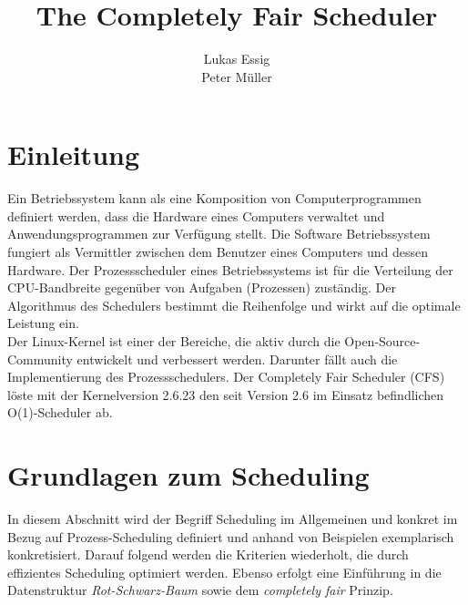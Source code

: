 \documentclass[ngerman]{seminarvorlage}
\begin{document}
\title{The Completely Fair Scheduler}
\author{
  \alignauthor Lukas Essig\\
  \alignauthor Peter Müller\\
}

\maketitle



\section{Einleitung}
Ein Betriebssystem kann als eine Komposition von Computerprogrammen definiert werden, dass die Hardware eines Computers verwaltet und Anwendungsprogrammen zur Verfügung stellt. Die Software Betriebssystem fungiert als Vermittler zwischen dem Benutzer eines Computers und dessen Hardware. Der Prozessscheduler eines Betriebssystems ist für die Verteilung der CPU-Bandbreite gegenüber von Aufgaben (Prozessen) zuständig. Der Algorithmus des Schedulers bestimmt die Reihenfolge und wirkt auf die optimale Leistung ein.\\
Der Linux-Kernel ist einer der Bereiche, die aktiv durch die Open-Source-Community entwickelt und verbessert werden. Darunter fällt auch die Implementierung des Prozessschedulers. Der Completely Fair Scheduler (CFS) löste mit der Kernelversion 2.6.23 den seit Version 2.6 im Einsatz befindlichen O(1)-Scheduler ab.

\section{Grundlagen zum Scheduling}
In diesem Abschnitt wird der Begriff Scheduling im Allgemeinen und konkret im Bezug auf Prozess-Scheduling definiert und anhand von Beispielen exemplarisch konkretisiert. 
Darauf folgend werden die Kriterien wiederholt, die durch effizientes Scheduling optimiert werden.
Ebenso erfolgt eine Einführung in die Datenstruktur \textit{Rot-Schwarz-Baum} sowie dem \textit{completely fair} Prinzip.
\end{document}
